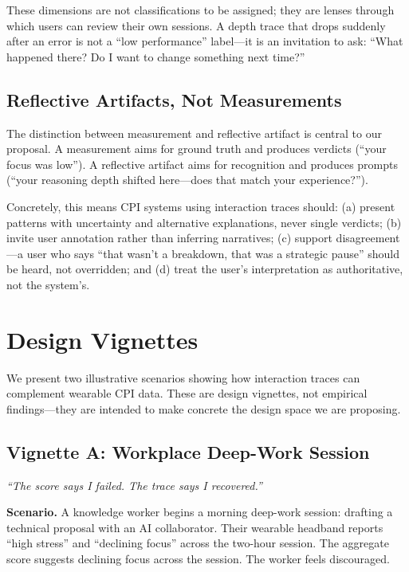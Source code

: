 \documentclass[10pt]{article}
\begin{document}
These dimensions are not classifications to be assigned; they are lenses through which users can review their own sessions. A depth trace that drops suddenly after an error is not a ``low performance'' label---it is an invitation to ask: ``What happened there? Do I want to change something next time?''

\subsection{Reflective Artifacts, Not Measurements}

The distinction between measurement and reflective artifact is central to our proposal. A measurement aims for ground truth and produces verdicts (``your focus was low''). A reflective artifact aims for recognition and produces prompts (``your reasoning depth shifted here---does that match your experience?'').

Concretely, this means CPI systems using interaction traces should: (a) present patterns with uncertainty and alternative explanations, never single verdicts; (b) invite user annotation rather than inferring narratives; (c) support disagreement---a user who says ``that wasn't a breakdown, that was a strategic pause'' should be heard, not overridden; and (d) treat the user's interpretation as authoritative, not the system's.

\section{Design Vignettes}

We present two illustrative scenarios showing how interaction traces can complement wearable CPI data. These are design vignettes, not empirical findings---they are intended to make concrete the design space we are proposing.

\subsection{Vignette A: Workplace Deep-Work Session}

\textit{``The score says I failed. The trace says I recovered.''}

\textbf{Scenario.} A knowledge worker begins a morning deep-work session: drafting a technical proposal with an AI collaborator. Their wearable headband reports ``high stress'' and ``declining focus'' across the two-hour session. The aggregate score suggests declining focus across the session. The worker feels discouraged.
\end{document}
